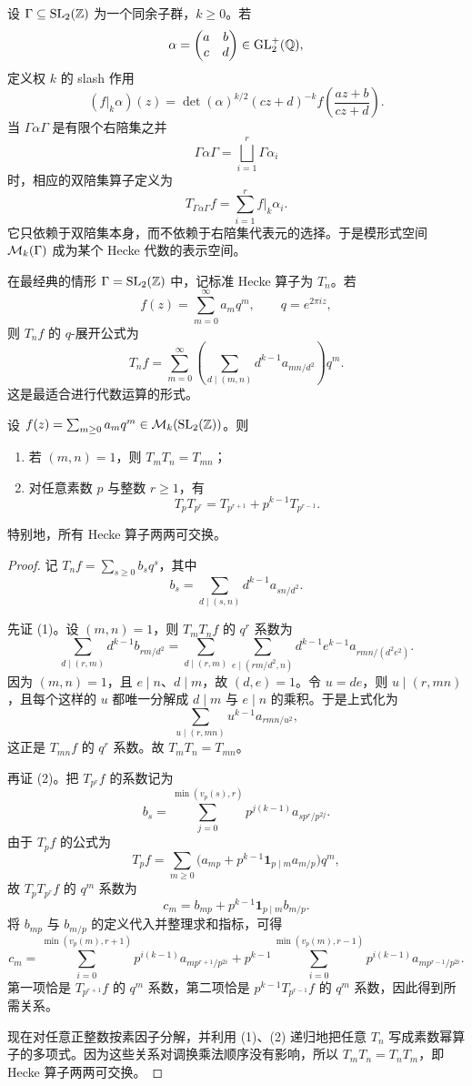 设 $\Gamma\subseteq \mathrm{SL}_2(\mathbb{Z})$ 为一个同余子群，$k\ge 0$。若
\[
\alpha=\begin{pmatrix} a&b\\c&d \end{pmatrix}\in \mathrm{GL}_2^+(\mathbb{Q}),
\]
定义权 $k$ 的 slash 作用
\[
(f|_k\alpha)(z)=\det(\alpha)^{k/2}(cz+d)^{-k}f\left(\frac{az+b}{cz+d}\right).
\]
当 $\Gamma\alpha\Gamma$ 是有限个右陪集之并
\[
\Gamma\alpha\Gamma=\bigsqcup_{i=1}^r \Gamma\alpha_i
\]
时，相应的双陪集算子定义为
\[
T_{\Gamma\alpha\Gamma}f=\sum_{i=1}^r f|_k\alpha_i.
\]
它只依赖于双陪集本身，而不依赖于右陪集代表元的选择。于是模形式空间 $\mathcal{M}_k(\Gamma)$ 成为某个 Hecke 代数的表示空间。

在最经典的情形 $\Gamma=\mathrm{SL}_2(\mathbb{Z})$ 中，记标准 Hecke 算子为 $T_n$。若
\[
f(z)=\sum_{m=0}^{\infty}a_mq^m,\qquad q=e^{2\pi i z},
\]
则 $T_n f$ 的 $q$-展开公式为
\[
T_n f=\sum_{m=0}^{\infty}\left(\sum_{d\mid (m,n)} d^{k-1}a_{mn/d^2}\right)q^m.
\]
这是最适合进行代数运算的形式。

\begin{proposition}
设 $f(z)=\sum_{m\ge 0}a_mq^m\in \mathcal{M}_k(\mathrm{SL}_2(\mathbb{Z}))$。则
\begin{enumerate}[label=\textnormal{(\arabic*)}]
  \item 若 $(m,n)=1$，则 $T_mT_n=T_{mn}$；
  \item 对任意素数 $p$ 与整数 $r\ge 1$，有
  \[
  T_pT_{p^r}=T_{p^{r+1}}+p^{k-1}T_{p^{r-1}}.
  \]
\end{enumerate}
特别地，所有 Hecke 算子两两可交换。
\end{proposition}

\begin{proof}
记 $T_nf=\sum_{s\ge 0}b_sq^s$，其中
\[
b_s=\sum_{d\mid (s,n)}d^{k-1}a_{sn/d^2}.
\]

先证 (1)。设 $(m,n)=1$，则 $T_mT_nf$ 的 $q^r$ 系数为
\[
\sum_{d\mid (r,m)}d^{k-1}b_{rm/d^2}
=\sum_{d\mid (r,m)}\sum_{e\mid (rm/d^2,n)}d^{k-1}e^{k-1}a_{rmn/(d^2e^2)}.
\]
因为 $(m,n)=1$，且 $e\mid n$、$d\mid m$，故 $(d,e)=1$。令 $u=de$，则 $u\mid (r,mn)$，且每个这样的 $u$ 都唯一分解成 $d\mid m$ 与 $e\mid n$ 的乘积。于是上式化为
\[
\sum_{u\mid (r,mn)}u^{k-1}a_{rmn/u^2},
\]
这正是 $T_{mn}f$ 的 $q^r$ 系数。故 $T_mT_n=T_{mn}$。

再证 (2)。把 $T_{p^r}f$ 的系数记为
\[
b_s=\sum_{j=0}^{\min(v_p(s),r)}p^{j(k-1)}a_{sp^r/p^{2j}}.
\]
由于 $T_pf$ 的公式为
\[
T_pf=\sum_{m\ge 0}\bigl(a_{mp}+p^{k-1}\mathbf{1}_{p\mid m}a_{m/p}\bigr)q^m,
\]
故 $T_pT_{p^r}f$ 的 $q^m$ 系数为
\[
c_m=b_{mp}+p^{k-1}\mathbf{1}_{p\mid m}b_{m/p}.
\]
将 $b_{mp}$ 与 $b_{m/p}$ 的定义代入并整理求和指标，可得
\[
c_m=
\sum_{i=0}^{\min(v_p(m),r+1)}p^{i(k-1)}a_{mp^{r+1}/p^{2i}}
+ p^{k-1}\sum_{i=0}^{\min(v_p(m),r-1)}p^{i(k-1)}a_{mp^{r-1}/p^{2i}}.
\]
第一项恰是 $T_{p^{r+1}}f$ 的 $q^m$ 系数，第二项恰是 $p^{k-1}T_{p^{r-1}}f$ 的 $q^m$ 系数，因此得到所需关系。

现在对任意正整数按素因子分解，并利用 (1)、(2) 递归地把任意 $T_n$ 写成素数幂算子的多项式。因为这些关系对调换乘法顺序没有影响，所以 $T_mT_n=T_nT_m$，即 Hecke 算子两两可交换。
\end{proof}

